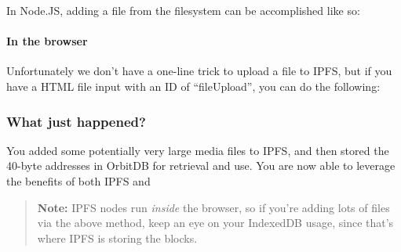 In Node.JS, adding a file from the filesystem can be accomplished like
so:

\begin{Shaded}
\begin{Highlighting}[]
\OperatorTok{=} \NormalTok{(}\NormalTok{)}
\OperatorTok{=}  \NormalTok{(}\NormalTok{)}

\NormalTok{(}\NormalTok{(}\NormalTok{)}
\end{Highlighting}
\end{Shaded}

\paragraph{In the browser}\label{in-the-browser-1}

Unfortunately we don't have a one-line trick to upload a file to IPFS,
but if you have a HTML file input with an ID of ``fileUpload'', you can
do the following:

\begin{Shaded}
\begin{Highlighting}[]
\OperatorTok{=} \NormalTok{(}\NormalTok{)}
\end{Highlighting}
\end{Shaded}

\subsubsection{What just happened?}\label{what-just-happened-9}

You added some potentially very large media files to IPFS, and then
stored the 40-byte addresses in OrbitDB for retrieval and use. You are
now able to leverage the benefits of both IPFS and

\begin{quote}
\textbf{Note:} IPFS nodes run \emph{inside} the browser, so if you're
adding lots of files via the above method, keep an eye on your IndexedDB
usage, since that's where IPFS is storing the blocks.
\end{quote}


